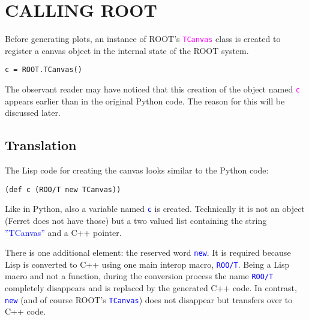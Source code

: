 \documentclass[twocolumn]{article}
\begin{document}
\section{CALLING ROOT}
Before generating plots, an instance of ROOT’s \texttt{\textcolor{magenta}{TCanvas}}  class is created to register a canvas object in the internal state of the ROOT system.
{\color{magenta}\begin{verbatim}
c = ROOT.TCanvas()
\end{verbatim}}
The observant reader may have noticed that this creation of the object named \texttt{\textcolor{magenta}{c}} appears earlier than in the original Python code. The reason for this will be discussed later.

\subsection{Translation} 
The Lisp code for creating the canvas looks similar to the Python code:
{\color{blue}\begin{verbatim}
(def c (ROO/T new TCanvas))
\end{verbatim}}
Like in Python, also a variable named \texttt{\textcolor{blue}{c}} is created. Technically it is not an object (Ferret does not have those) but a two valued list containing the string \textcolor{blue}{”TCanvas”}  and a C++ pointer.

There is one additional element: the reserved word \texttt{\textcolor{blue}{new}}. It is required because Lisp is converted to C++ using one main interop macro, \texttt{\textcolor{blue}{ROO/T}}. Being a Lisp macro and not a function, during the conversion process the name \texttt{\textcolor{blue}{ROO/T}} completely disappears and is replaced by the generated C++ code. In contrast, \texttt{\textcolor{blue}{new}} (and of course ROOT’s \texttt{\textcolor{blue}{TCanvas}}) does not disappear but transfers over to C++ code.
\end{document}
